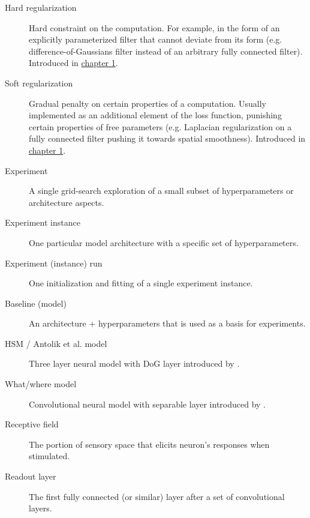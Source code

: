 
\begin{description}
	
	\item[Hard regularization]\label{glos:hard-reg} Hard constraint on the computation. For example, in the form of an explicitly parameterized filter that cannot deviate from its form (e.g. difference-of-Gaussians filter instead of an arbitrary fully connected filter). Introduced in \hyperref[intr:hard-reg]{chapter 1}.
	
	\item[Soft regularization]\label{glos:soft-reg} Gradual penalty on certain properties of a computation. Usually implemented as an additional element of the loss function, punishing certain properties of free parameters (e.g. Laplacian regularization on a fully connected filter pushing it towards spatial smoothness). Introduced in \hyperref[intr:soft-reg]{chapter 1}.
	
	\item[Experiment] A single grid-search exploration of a small subset of hyperparameters or architecture aspects.
	
	\item[Experiment instance] One particular model architecture with a specific set of hyperparameters.
	
	\item[Experiment (instance) run] One initialization and fitting of a single experiment instance.
	
	\item[Baseline (model)] An architecture + hyperparameters that is used as a basis for experiments.
	
	\item[HSM / Antolik et al. model] Three layer neural model with DoG layer introduced by \cite{antolik}.

	\item[What/where model] Convolutional neural model with separable layer introduced by \cite{klindt}.

	\item[Receptive field] The portion of sensory space that elicits neuron’s responses when stimulated.

	\item[Readout layer] The first fully connected (or similar) layer after a set of convolutional layers.

\end{description}

